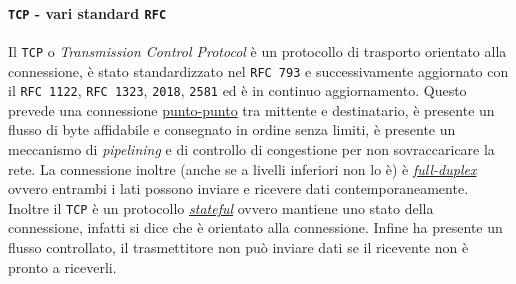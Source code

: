     \paragraph{\texttt{TCP} - vari standard \texttt{RFC}} Il \texttt{TCP} o \textit{Transmission Control Protocol} è un protocollo di trasporto orientato alla connessione, è stato standardizzato nel \texttt{RFC 793} e successivamente aggiornato con il \texttt{RFC 1122}, \texttt{RFC 1323}, \texttt{2018}, \texttt{2581} ed è in continuo aggiornamento. Questo prevede una connessione \underline{punto-punto} tra mittente e destinatario, è presente un flusso di byte affidabile e consegnato in ordine senza limiti, è presente un meccanismo di \textit{pipelining} e di controllo di congestione per non sovraccaricare la rete. La connessione inoltre (anche se a livelli inferiori non lo è) è \textit{\underline{full-duplex}} ovvero entrambi i lati possono inviare e ricevere dati contemporaneamente. Inoltre il \texttt{TCP} è un protocollo \textit{\underline{stateful}} ovvero mantiene uno stato della connessione, infatti si dice che è orientato alla connessione. Infine ha presente un flusso controllato, il trasmettitore non può inviare dati se il ricevente non è pronto a riceverli.\newpage
